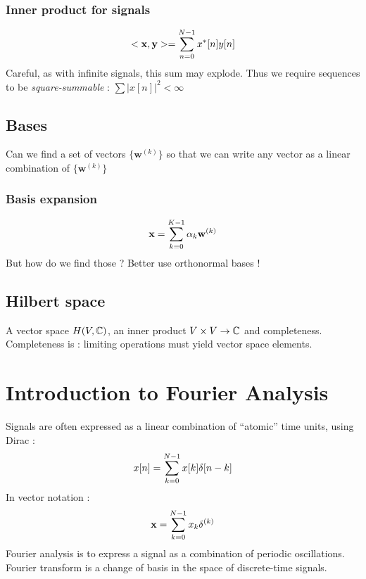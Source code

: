 \documentclass[11pt,a4paper]{article}
\numberwithin{equation}{section}
\begin{document}
\subsubsection{Inner product for signals}
\begin{equation}
    <\mathbf{x,y}> = \somme{N-1}{n=0} x^*[n]y[n]
\end{equation}
Careful, as with infinite signals, this sum may explode. Thus we require sequences to be \textit{square-summable} : $\sum |x[n]|^2 < \infty$
\subsection{Bases}
Can we find a set of vectors $\{\mathbf{w}^{(k)}\}$ so that we can write any vector as a linear combination of $\{\mathbf{w}^{(k)}\}$
\subsubsection{Basis expansion}
\begin{equation}
    \mathbf{x} = \somme{K-1}{k=0}\alpha_k \mathbf{w}^{(k)}
\end{equation}
But how do we find those ? Better use orthonormal bases !

\subsection{Hilbert space}
A vector space $H(V,\C)$, an inner product $V\times V \to \C$ and completeness. Completeness is : limiting operations must yield vector space elements.

\section{Introduction to Fourier Analysis}
Signals are often expressed as a linear combination of ``atomic'' time units, using Dirac :
\begin{equation}
    x[n] = \somme{N-1}{k=0}x[k]\delta[n-k]
\end{equation}
In vector notation : 
\begin{equation}
    \mathbf{x} = \somme{N-1}{k=0}x_k\mathbb{\delta}^{(k)}
\end{equation}
Fourier analysis is to express a signal as a combination of periodic oscillations. Fourier transform is a change of basis in the space of discrete-time signals. 
\end{document}
